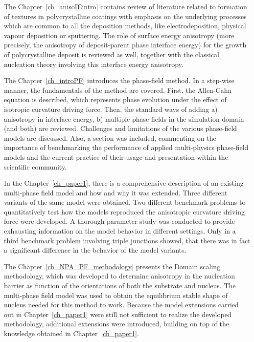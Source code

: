 The Chapter~\ref{ch_anisoIEintro} contains review of literature related to formation of textures in polycrystalline coatings with emphasis on the underlying processes which are common to all the deposition methods, like electrodeposition, physical vapour deposition or sputtering. The role of surface energy anisotropy (more precisely, the anisotropy of deposit-parent phase interface energy) for the growth of polycrystalline deposit is reviewed as well, together with the classical nucleation theory involving this interface energy anisotropy.

The Chapter~\ref{ch_introPF} introduces the phase-field method. In a step-wise manner, the fundamentals of the method are covered. First, the Allen-Cahn equation is described, which represents phase evolution under the effect of isotropic curvature driving force. Then, the standard ways of adding a) anisotropy in interface energy, b) multiple phase-fields in the simulation domain (and both) are reviewed. Challenges and limitations of the various phase-field models are discussed. Also, a section was included, commenting on the importance of benchmarking the performance of applied multi-physics phase-field models and the current practice of their usage and presentation within the scientific community.

In the Chapter~\ref{ch_paper1}, there is a comprehensive description of an existing multi-phase field model and how and why it was extended. Three different variants of the same model were obtained. Two different benchmark problems to quantitatively test how the models reproduced the anisotropic curvature driving force were developed. A thorough parameter study was conducted to provide exhausting information on the model behavior in different settings. Only in a third benchmark problem involving triple junctions showed, that there was in fact a significant difference in the behavior of the model variants. 

The Chapter~\ref{ch_NPA_PF_methodology} presents the Domain scaling methodology, which was developed to determine anisotropy in the nucleation barrier as function of the orientations of both the substrate and nucleus. The multi-phase field model was used to obtain the equilibrium stable shape of nucleus needed for this method to work. Because the model extensions carried out in Chapter~\ref{ch_paper1} were still not sufficient to realize the developed methodology, additional extensions were introduced, building on top of the knowledge obtained in Chapter~\ref{ch_paper1}. 

